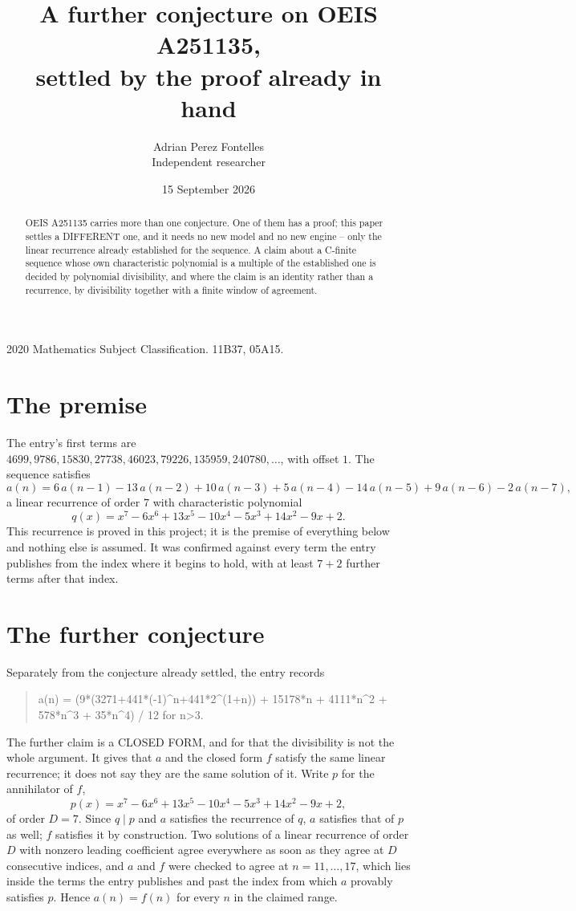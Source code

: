 \documentclass[11pt,a4paper]{article}
\title{A further conjecture on OEIS A251135,\\ \large settled by the proof already in hand}
\author{Adrian Perez Fontelles\\ \small Independent researcher}
\date{15 September 2026}
\theoremstyle{plain}
\theoremstyle{definition}
\begin{document}
\maketitle

\begin{abstract}
OEIS A251135 carries more than one conjecture. One of them has a proof; this paper settles a
DIFFERENT one, and it needs no new model and no new engine -- only the linear recurrence already
established for the sequence. A claim about a C-finite sequence whose own characteristic
polynomial is a multiple of the established one is decided by polynomial divisibility, and where
the claim is an identity rather than a recurrence, by divisibility together with a finite window
of agreement.
\end{abstract}

\noindent\small 2020 Mathematics Subject Classification. 11B37, 05A15.\normalsize

\section{The premise}

The entry's first terms are $4699, 9786, 15830, 27738, 46023, 79226, 135959, 240780,\dots$, with offset $1$. The sequence satisfies
\[
  a(n)=6\,a(n-1) - 13\,a(n-2) + 10\,a(n-3) + 5\,a(n-4) - 14\,a(n-5) + 9\,a(n-6) - 2\,a(n-7) ,
\]
a linear recurrence of order $7$ with characteristic polynomial
\[
  q(x)=x^{7} - 6 x^{6} + 13 x^{5} - 10 x^{4} - 5 x^{3} + 14 x^{2} - 9 x + 2 .
\]
This recurrence is proved in this project; it is the premise of everything below and nothing else is assumed.
It was confirmed against every term the entry publishes from the index where it begins to hold,
with at least $7+2$ further terms after that index.

\section{The further conjecture}

Separately from the conjecture already settled, the entry records

\begin{quote}\raggedright a(n) = (9*(3271+441*(-1)\^{}n+441*2\^{}(1+n)) + 15178*n + 4111*n\^{}2 + 578*n\^{}3 + 35*n\^{}4) / 12 for n>3.\end{quote}

The further claim is a CLOSED FORM, and for that the divisibility is not the whole argument. It
gives that $a$ and the closed form $f$ satisfy the same linear recurrence; it does not say they
are the same solution of it. Write $p$ for the annihilator of $f$,
\[
  p(x)=x^{7} - 6 x^{6} + 13 x^{5} - 10 x^{4} - 5 x^{3} + 14 x^{2} - 9 x + 2 ,
\]
of order $D=7$. Since $q\mid p$ and $a$ satisfies the recurrence of $q$, $a$ satisfies that of
$p$ as well; $f$ satisfies it by construction. Two solutions of a linear recurrence of order $D$
with nonzero leading coefficient agree everywhere as soon as they agree at $D$ consecutive
indices, and $a$ and $f$ were checked to agree at $n=11,\dots,17$,
which lies inside the terms the entry publishes and past the index from which $a$ provably
satisfies $p$. Hence $a(n)=f(n)$ for every $n$ in the claimed range.
\end{document}
